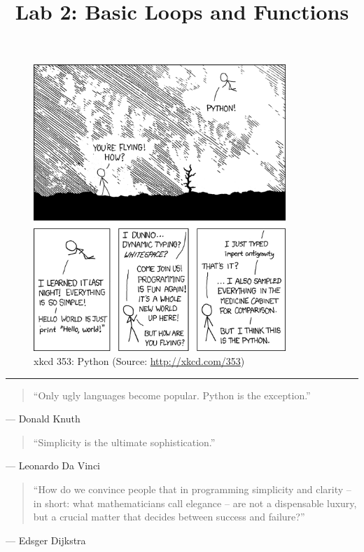 \documentclass[11pt]{cselabheader}
\title{Lab 2: Basic Loops and Functions}
\begin{document}
\maketitle

\begin{figure}[H]
  \centering
  \includegraphics[width=0.85\textwidth]{img/xkcd_python.png}
  \caption{xkcd 353: Python (Source: \url{http://xkcd.com/353})}
\end{figure}

\pagebreak
\thispagestyle{empty}
\hrule
\begin{quotation}
``Only ugly languages become popular. Python is the exception.''
\end{quotation}
\begin{flushright}
  --- Donald Knuth
\end{flushright}

\begin{quotation}
``Simplicity is the ultimate sophistication.''
\end{quotation}
\begin{flushright}
--- Leonardo Da Vinci
\end{flushright}

\begin{quotation}
``How do we convince people that in programming simplicity and clarity -- in
short: what mathematicians call elegance -- are not a dispensable luxury, but
a crucial matter that decides between success and failure?''
\end{quotation}
\begin{flushright}
--- Edsger Dijkstra
\end{flushright}
\end{document}
